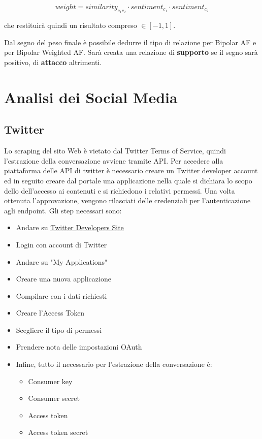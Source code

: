 $$weight = similarity_{c_1 c_2} \cdot sentiment_{c_1} \cdot sentiment_{c_2}$$

che restituirà quindi un risultato compreso $\in [-1, 1]$.

Dal segno del peso finale è possibile dedurre il tipo di relazione per Bipolar AF e per Bipolar Weighted AF. Sarà creata una relazione di \textbf{supporto} se il segno sarà positivo, di \textbf{attacco} altrimenti. 

\section{Analisi dei Social Media}
\label{section:data_sources}

\subsection {Twitter} %

Lo scraping del sito Web è vietato dal Twitter Terms of Service, quindi l'estrazione della conversazione avviene tramite API. Per accedere alla piattaforma delle API di twitter è necessario creare un Twitter developer account ed in seguito creare dal portale una applicazione nella quale si dichiara lo scopo dello dell'accesso ai contenuti e si richiedono i relativi permessi. Una volta ottenuta l'approvazione, vengono rilasciati delle credenziali per l'autenticazione agli endpoint. Gli step necessari sono:
  

\begin{itemize}  
    \item Andare su {\color{blue}\underline{\href{https://.dev.twitter.com}{Twitter Developers Site}}}
    \item Login con account di Twitter
    \item Andare su "My Applications"
    \item Creare una nuova applicazione
    \item Compilare con i dati richiesti
    \item Creare l'Access Token
    \item Scegliere il tipo di permessi
    \item Prendere nota delle impostazioni OAuth
    \item Infine, tutto il necessario per l'estrazione della conversazione è: \begin{itemize}
        \item Consumer key
        \item Consumer secret
        \item Access token
        \item Access token secret
    \end{itemize}
\end{itemize}

